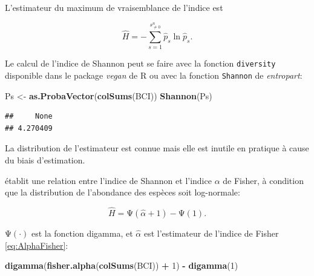 \documentclass[
  11pt,
  french,
  a4paper,
  extrafontsizes,onecolumn,openright
  ]{memoir}
\newenvironment{Shaded}{\begin{snugshade}}{\end{snugshade}}
\newcommand{\DecValTok}[1]{\textcolor[rgb]{0.00,0.00,0.81}{#1}}
\newcommand{\FunctionTok}[1]{\textcolor[rgb]{0.13,0.29,0.53}{\textbf{#1}}}
\newcommand{\NormalTok}[1]{#1}
\newcommand{\OtherTok}[1]{\textcolor[rgb]{0.56,0.35,0.01}{#1}}
\newcommand{\SpecialCharTok}[1]{\textcolor[rgb]{0.81,0.36,0.00}{\textbf{#1}}}
\begin{document}
L'estimateur du maximum de vraisemblance de l'indice est

\begin{equation}
  \label{eq:EstShannonML}
  \hat{H} = -\sum^{s^{n}_{\ne 0}}_{s=1}{\hat{p}_s \ln{\hat{p}_s}}.
\end{equation}

Le calcul de l'indice de Shannon peut se faire avec la fonction \texttt{diversity} disponible dans le package \emph{vegan} de R ou avec la fonction \texttt{Shannon} de \emph{entropart}:

\scriptsize

\begin{Shaded}
\begin{Highlighting}[]
\NormalTok{Ps }\OtherTok{\textless{}{-}} \FunctionTok{as.ProbaVector}\NormalTok{(}\FunctionTok{colSums}\NormalTok{(BCI))}
\FunctionTok{Shannon}\NormalTok{(Ps)}
\end{Highlighting}
\end{Shaded}

\begin{verbatim}
##     None 
## 4.270409
\end{verbatim}

\normalsize

La distribution de l'estimateur est connue \autocite{Hutcheson1970} mais elle est inutile en pratique à cause du biais d'estimation.

\textcite{Bulmer1974} établit une relation entre l'indice de Shannon et l'indice \(\alpha\) de Fisher, à condition que la distribution de l'abondance des espèces soit log-normale:

\begin{equation}
  \label{eq:Bulmer1974}
  \hat{H} = \mathrm{\Psi}\left(\hat{\alpha}+1\right) - \mathrm{\Psi}\left(1\right).
\end{equation}

\(\mathrm{\Psi}(\cdot)\) est la fonction digamma, et \(\hat{\alpha}\) est l'estimateur de l'indice de Fisher \eqref{eq:AlphaFisher}:

\scriptsize

\begin{Shaded}
\begin{Highlighting}[]
\FunctionTok{digamma}\NormalTok{(}\FunctionTok{fisher.alpha}\NormalTok{(}\FunctionTok{colSums}\NormalTok{(BCI)) }\SpecialCharTok{+} \DecValTok{1}\NormalTok{) }\SpecialCharTok{{-}} \FunctionTok{digamma}\NormalTok{(}\DecValTok{1}\NormalTok{)}
\end{Highlighting}
\end{Shaded}
\end{document}
